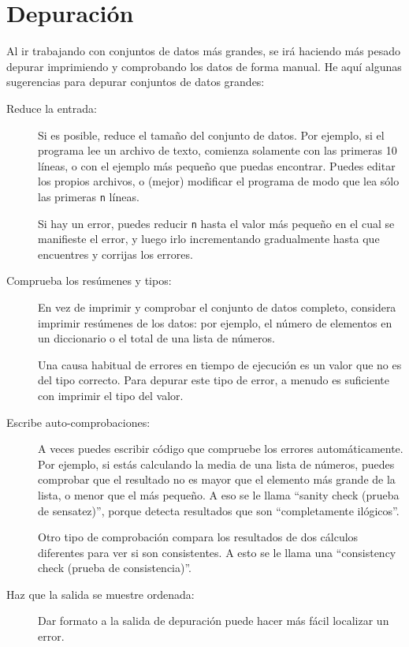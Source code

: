 \section{Depuración}

Al ir trabajando con conjuntos de datos más grandes, se irá haciendo más
pesado depurar imprimiendo y comprobando los datos de forma manual. He aquí algunas
sugerencias para depurar conjuntos de datos grandes:

\begin{description}

\item[Reduce la entrada:] Si es posible, reduce el tamaño del
conjunto de datos. Por ejemplo, si el programa lee un archivo de texto,
comienza solamente con las primeras 10 líneas, o con el ejemplo más pequeño
que puedas encontrar. Puedes editar los propios archivos, o (mejor) modificar el
programa de modo que lea sólo las primeras {\tt n} líneas.

Si hay un error, puedes reducir {\tt n} hasta el valor
más pequeño en el cual se manifieste el error, y luego irlo incrementando gradualmente
hasta que encuentres y corrijas los errores.

\item[Comprueba los resúmenes y tipos:] En vez de imprimir y comprobar el
conjunto de datos completo, considera imprimir resúmenes de los datos: por ejemplo,
el número de elementos en un diccionario o el total de una lista de números.

Una causa habitual de errores en tiempo de ejecución es un valor que no es del tipo
correcto. Para depurar este tipo de error, a menudo es suficiente con imprimir
el tipo del valor.

\item[Escribe auto-comprobaciones:] A veces puedes escribir código que compruebe
los errores automáticamente. Por ejemplo, si estás calculando la
media de una lista de números, puedes comprobar que el resultado no
es mayor que el elemento más grande de la lista, o menor que el más
pequeño. A eso se le llama ``sanity check (prueba de sensatez)'', porque detecta
resultados que son ``completamente ilógicos''.


Otro tipo de comprobación compara los resultados de dos cálculos
diferentes para ver si son consistentes. A esto se le llama una
``consistency check (prueba de consistencia)''.

\item[Haz que la salida se muestre ordenada:] Dar formato a la salida de depuración
puede hacer más fácil localizar un error.

\end{description}

